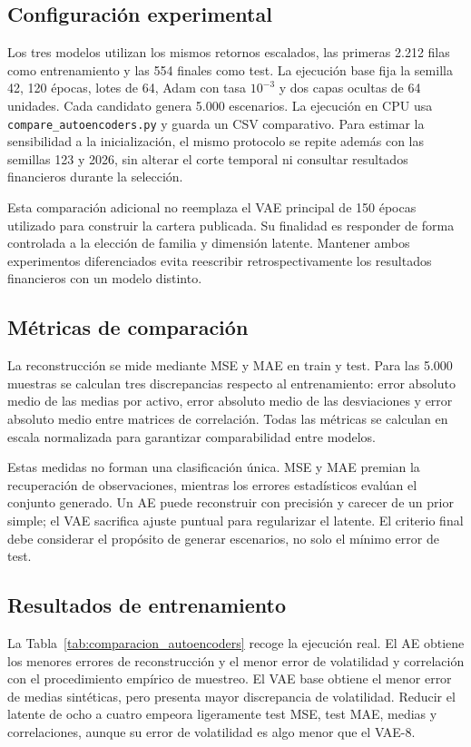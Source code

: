 \subsection{Configuración experimental}
Los tres modelos utilizan los mismos retornos escalados, las primeras 2.212 filas como entrenamiento y las 554 finales como test. La ejecución base fija la semilla 42, 120 épocas, lotes de 64, Adam con tasa $10^{-3}$ y dos capas ocultas de 64 unidades. Cada candidato genera 5.000 escenarios. La ejecución en CPU usa \texttt{compare\_autoencoders.py} y guarda un CSV comparativo. Para estimar la sensibilidad a la inicialización, el mismo protocolo se repite además con las semillas 123 y 2026, sin alterar el corte temporal ni consultar resultados financieros durante la selección.

Esta comparación adicional no reemplaza el VAE principal de 150 épocas utilizado para construir la cartera publicada. Su finalidad es responder de forma controlada a la elección de familia y dimensión latente. Mantener ambos experimentos diferenciados evita reescribir retrospectivamente los resultados financieros con un modelo distinto.

\subsection{Métricas de comparación}
La reconstrucción se mide mediante MSE y MAE en train y test. Para las 5.000 muestras se calculan tres discrepancias respecto al entrenamiento: error absoluto medio de las medias por activo, error absoluto medio de las desviaciones y error absoluto medio entre matrices de correlación. Todas las métricas se calculan en escala normalizada para garantizar comparabilidad entre modelos.

Estas medidas no forman una clasificación única. MSE y MAE premian la recuperación de observaciones, mientras los errores estadísticos evalúan el conjunto generado. Un AE puede reconstruir con precisión y carecer de un prior simple; el VAE sacrifica ajuste puntual para regularizar el latente. El criterio final debe considerar el propósito de generar escenarios, no solo el mínimo error de test.

\subsection{Resultados de entrenamiento}
La Tabla~\ref{tab:comparacion_autoencoders} recoge la ejecución real. El AE obtiene los menores errores de reconstrucción y el menor error de volatilidad y correlación con el procedimiento empírico de muestreo. El VAE base obtiene el menor error de medias sintéticas, pero presenta mayor discrepancia de volatilidad. Reducir el latente de ocho a cuatro empeora ligeramente test MSE, test MAE, medias y correlaciones, aunque su error de volatilidad es algo menor que el VAE-8.

